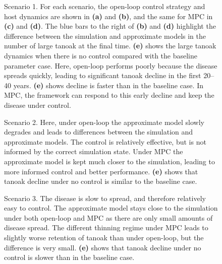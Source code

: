 \begin{figure}[H]
    \begin{center}
        \caption[Parameter uncertainty scenario 1]{Scenario 1. For each scenario, the open-loop control strategy and host dynamics are shown in \textbf{(a)} and \textbf{(b)}, and the same for MPC in \textbf{(c)} and \textbf{(d)}. The blue bars to the right of \textbf{(b)} and \textbf{(d)} highlight the difference between the simulation and approximate models in the number of large tanoak at the final time. \textbf{(e)} shows the large tanoak dynamics when there is no control compared with the baseline parameter case. Here, open-loop performs poorly because the disease spreads quickly, leading to significant tanoak decline in the first 20--40 years. \textbf{(e)} shows decline is faster than in the baseline case. In MPC, the framework can respond to this early decline and keep the disease under control.\label{fig:case1}}
    \end{center}
\end{figure}

\begin{figure}[H]
    \begin{center}
        \caption[Parameter uncertainty scenario 2]{Scenario 2. Here, under open-loop the approximate model slowly degrades and leads to differences between the simulation and approximate models. The control is relatively effective, but is not informed by the correct simulation state. Under MPC the approximate model is kept much closer to the simulation, leading to more informed control and better performance. \textbf{(e)} shows that tanoak decline under no control is similar to the baseline case.}
    \end{center}
\end{figure}

\begin{figure}[H]
    \begin{center}
        \caption[Parameter uncertainty scenario 3]{Scenario 3. The disease is slow to spread, and therefore relatively easy to control. The approximate model stays close to the simulation under both open-loop and MPC as there are only small amounts of disease spread. The different thinning regime under MPC leads to slightly worse retention of tanoak than under open-loop, but the difference is very small. \textbf{(e)} shows that tanoak decline under no control is slower than in the baseline case.}
    \end{center}
\end{figure}

